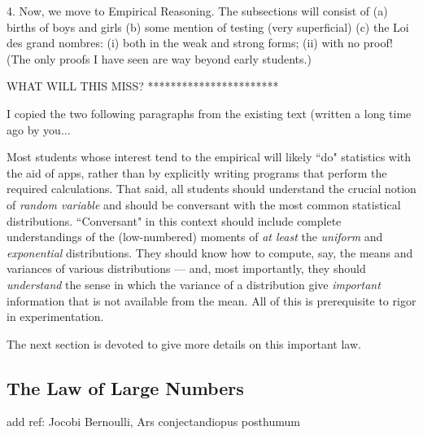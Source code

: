 4. Now, we move to Empirical Reasoning.  The subsections will consist of
(a) births of boys and girls
(b) some mention of testing (very superficial)
(c) the Loi des grand nombres: (i) both in the weak and strong forms; (ii) with no proof!  (The only proofs I have seen are way beyond early students.)

WHAT WILL THIS MISS?
***********************

{\Denis I copied the two following paragraphs from the existing text (written a long time ago by you...}

Most students whose interest tend to the empirical will likely ``do"
statistics with the aid of apps, rather than by explicitly writing
programs that perform the required calculations.  That said, all
students should understand the crucial notion of {\em random variable}
and should be conversant with the most common statistical
distributions.  ``Conversant" in this context should include complete
understandings of the (low-numbered) moments of {\em at least} the
{\em uniform} and {\em exponential} distributions.  They should know
how to compute, say, the means and variances of various distributions
— and, most importantly, they should {\em understand} the sense in
which the variance of a distribution give {\em important} information
that is not available from the mean.  All of this is prerequisite to
rigor in experimentation.




\noindent {}
\bigskip

The next section is devoted to give more details on this important law.


\subsection{The Law of Large Numbers} 
\label{subsec:LawLargeNumbers}

{\Denis add ref: Jocobi Bernoulli, Ars conjectandiopus posthumum}

